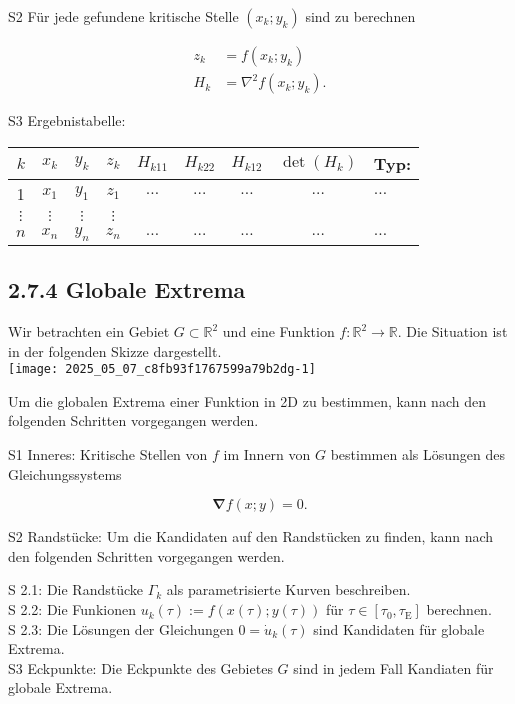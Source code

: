 \documentclass[10pt]{article}
\begin{document}
S2 Für jede gefundene kritische Stelle $\left(x_{k} ; y_{k}\right)$ sind zu berechnen


\begin{align*}
z_{k} & =f\left(x_{k} ; y_{k}\right)  \tag{2.212}\\
H_{k} & =\nabla^{2} f\left(x_{k} ; y_{k}\right) . \tag{2.213}
\end{align*}


S3 Ergebnistabelle:

\begin{center}
\begin{tabular}{|c|c|c|c|c|c|c|c|l|}
\hline
$k$ & $x_{k}$ & $y_{k}$ & $z_{k}$ & $H_{k 11}$ & $H_{k 22}$ & $H_{k 12}$ & $\operatorname{det}\left(H_{k}\right)$ & Typ: \\
\hline\hline
1 & $x_{1}$ & $y_{1}$ & $z_{1}$ & $\ldots$ & $\ldots$ & $\ldots$ & $\ldots$ & $\ldots$ \\
$\vdots$ & $\vdots$ & $\vdots$ & $\vdots$ &  &  &  &  &  \\
$n$ & $x_{n}$ & $y_{n}$ & $z_{n}$ & $\ldots$ & $\ldots$ & $\ldots$ & $\ldots$ & $\ldots$ \\
\hline
\end{tabular}
\end{center}

\subsection*{2.7.4 Globale Extrema}
Wir betrachten ein Gebiet $G \subset \mathbb{R}^{2}$ und eine Funktion $f: \mathbb{R}^{2} \rightarrow \mathbb{R}$. Die Situation ist in der folgenden Skizze dargestellt.\\
\texttt{[image: 2025\_05\_07\_c8fb93f1767599a79b2dg-1]}

Um die globalen Extrema einer Funktion in 2D zu bestimmen, kann nach den folgenden Schritten vorgegangen werden.

S1 Inneres: Kritische Stellen von $f$ im Innern von $G$ bestimmen als Lösungen des Gleichungssystems


\begin{equation*}
\boldsymbol{\nabla} f(x ; y)=0 . \tag{2.215}
\end{equation*}


S2 Randstücke: Um die Kandidaten auf den Randstücken zu finden, kann nach den folgenden Schritten vorgegangen werden.

S 2.1: Die Randstücke $\Gamma_{k}$ als parametrisierte Kurven beschreiben.\\
S 2.2: Die Funkionen $u_{k}(\tau):=f(x(\tau) ; y(\tau))$ für $\tau \in\left[\tau_{0}, \tau_{\mathrm{E}}\right]$ berechnen.\\
S 2.3: Die Lösungen der Gleichungen $0=\dot{u}_{k}(\tau)$ sind Kandidaten für globale Extrema.\\
S3 Eckpunkte: Die Eckpunkte des Gebietes $G$ sind in jedem Fall Kandiaten für globale Extrema.
\end{document}
